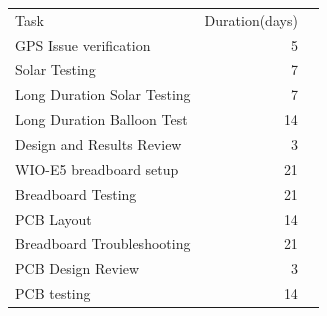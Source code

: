 \begin{table}[!htp]\centering
    \scriptsize
    \begin{tabular}{lrr}\toprule
        Task &Duration(days) \\\cmidrule{1-2}
        GPS Issue verification &5 \\
        Solar Testing &7 \\
        Long Duration Solar Testing &7 \\
        Long Duration Balloon Test &14 \\
        Design and Results Review &3 \\
        WIO-E5 breadboard setup &21 \\
        Breadboard Testing &21 \\
        PCB Layout &14 \\
        Breadboard Troubleshooting &21 \\
        PCB Design Review &3 \\
        PCB testing &14 \\
        \bottomrule
    \end{tabular}
\end{table}
